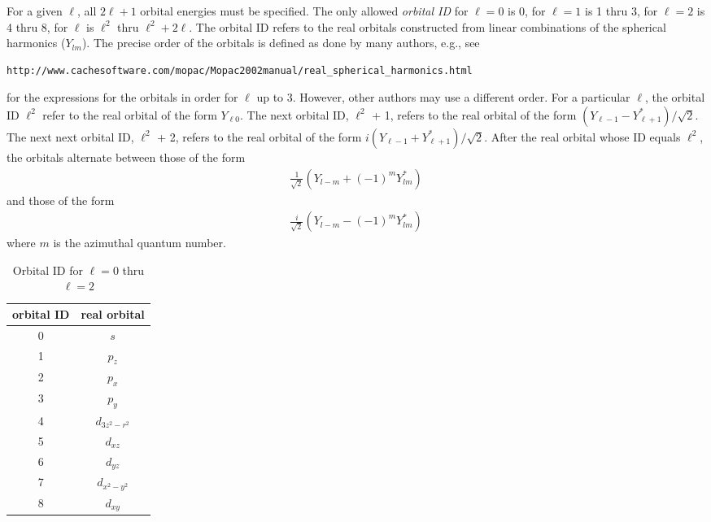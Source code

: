 \begin{description}
For a given $\ell$, all $2\ell+1$ orbital energies must be
specified. The only allowed {\it orbital ID} for $\ell = 0$ is 0,
for $\ell = 1$ is 1 thru 3, for $\ell = 2$ is 4 thru 8, for $\ell$
is $\ell^2$ thru $\ell^2 + 2\ell$. The orbital ID refers to the
real orbitals constructed from linear combinations of the
spherical harmonics ($Y_{lm}$). The precise order of the orbitals
is defined as done by many authors, e.g., see
\begin{small}
\begin{verbatim}
http://www.cachesoftware.com/mopac/Mopac2002manual/real_spherical_harmonics.html
\end{verbatim}
\end{small}
for the expressions for the orbitals in order for
$\ell$ up to 3. However, other authors may use a different order.
For a particular $\ell$, the orbital ID $\ell^2$ refer to the real
orbital of the form $Y_{\ell 0}$. The next orbital ID, $\ell^2$ +
1, refers to the real orbital of the form $(Y_{\ell-1} -
Y_{\ell+1}^\ast)/\sqrt{2}$. The next next orbital ID, $\ell^2$ +
2, refers to the real orbital of the form $i(Y_{\ell-1} +
Y_{\ell+1}^\ast)/\sqrt{2}$. After the real orbital whose ID equals
$\ell^2$, the orbitals alternate between those of the form
\begin{eqnarray*}
\frac{1}{\sqrt{2}}\left(Y_{l-m} + (-1)^m Y_{lm}^\ast\right)
\end{eqnarray*}
and those of the form
\begin{eqnarray*}
\frac{i}{\sqrt{2}}\left(Y_{l-m} - (-1)^m Y_{lm}^\ast\right)
\end{eqnarray*}
where $m$ is the azimuthal quantum number.

\begin{table}[ht]
\centering
\caption{Orbital ID for $\ell = 0$ thru $\ell = 2$}
\vspace{0.2cm}
\begin{tabular}{|c|c|}\hline
orbital ID & real orbital \\ \hline
0 & $s$   \\
1 & $p_z$ \\
2 & $p_x$ \\
3 & $p_y$ \\
4 & $d_{3z^2 - r^2}$ \\
5 & $d_{xz}$ \\
6 & $d_{yz}$ \\
7 & $d_{x^2-y^2}$ \\
8 & $d_{xy}$  \\ \hline
\end{tabular}
\end{table}


\end{description}
